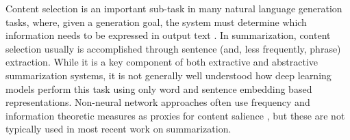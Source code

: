 




Content selection is an important sub-task in many natural language generation
tasks,
where, given a generation goal, the system must determine which information
needs to be expressed in output text \cite{gatt2018survey}.
In summarization, content selection usually is accomplished through sentence (and,
less frequently, phrase) extraction.
 While it is a key component of both
extractive and abstractive summarization systems, it is not generally well 
understood how deep learning models perform this task using only word and 
sentence
embedding based representations.
Non-neural network approaches often use frequency and information theoretic measures as proxies
for content salience \cite{hong2014improving}, but these are not typically
used in most recent work on summarization.

